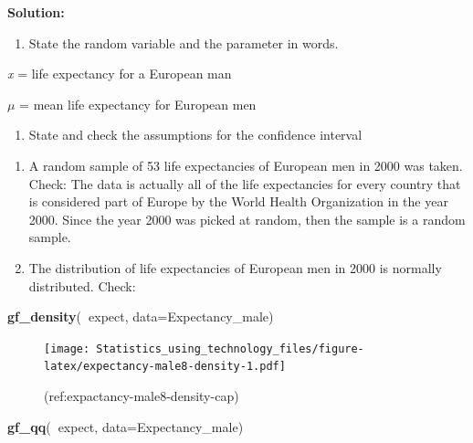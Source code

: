 \documentclass[
]{book}
\newenvironment{Shaded}{\begin{snugshade}}{\end{snugshade}}
\newcommand{\DataTypeTok}[1]{\textcolor[rgb]{0.13,0.29,0.53}{#1}}
\newcommand{\KeywordTok}[1]{\textcolor[rgb]{0.13,0.29,0.53}{\textbf{#1}}}
\newcommand{\NormalTok}[1]{#1}
\newcommand{\OperatorTok}[1]{\textcolor[rgb]{0.81,0.36,0.00}{\textbf{#1}}}
\providecommand{\tightlist}{%
  \setlength{\itemsep}{0pt}\setlength{\parskip}{0pt}}
\begin{document}
\textbf{Solution:}

\begin{enumerate}
\def\labelenumi{\arabic{enumi}.}
\tightlist
\item
  State the random variable and the parameter in words.
\end{enumerate}

\emph{x} = life expectancy for a European man

\(\mu\) = mean life expectancy for European men

\begin{enumerate}
\def\labelenumi{\arabic{enumi}.}
\setcounter{enumi}{1}
\tightlist
\item
  State and check the assumptions for the confidence interval
\end{enumerate}

\begin{enumerate}
\def\labelenumi{\alph{enumi}.}
\item
  A random sample of 53 life expectancies of European men in 2000 was taken. Check: The data is actually all of the life expectancies for every country that is considered part of Europe by the World Health Organization in the year 2000. Since the year 2000 was picked at random, then the sample is a random sample.
\item
  The distribution of life expectancies of European men in 2000 is normally distributed. Check:
\end{enumerate}



\begin{Shaded}
\begin{Highlighting}[]
\KeywordTok{gf_density}\NormalTok{(}\OperatorTok{~}\NormalTok{expect, }\DataTypeTok{data=}\NormalTok{Expectancy_male)}
\end{Highlighting}
\end{Shaded}

\begin{figure}
\centering
\texttt{[image: Statistics\_using\_technology\_files/figure-latex/expectancy-male8-density-1.pdf]}
\caption{\label{fig:expectancy-male8-density}(ref:expactancy-male8-density-cap)}
\end{figure}



\begin{Shaded}
\begin{Highlighting}[]
\KeywordTok{gf_qq}\NormalTok{(}\OperatorTok{~}\NormalTok{expect, }\DataTypeTok{data=}\NormalTok{Expectancy_male)}
\end{Highlighting}
\end{Shaded}
\end{document}
